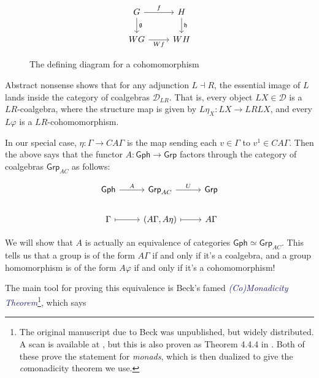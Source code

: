 \documentclass[microtype]{gtpart}
\theoremstyle{definition}
\theoremstyle{theorem}
\newcommand*{\catFont}[1]{\mathsf{#1}}
\newcommand{\Grp}{\catFont{Grp}}
\newcommand*{\important}[1]{\textcolor{MidnightBlue}{\emph{#1}}}
\begin{document}
\begin{figure}
    \[
        \begin{tikzcd}
        G & H \\
        WG & WH
        \arrow["\mathfrak{g}", from=1-1, to=2-1]
        \arrow["\mathfrak{h}", from=1-2, to=2-2]
        \arrow["f", from=1-1, to=1-2]
        \arrow["Wf"', from=2-1, to=2-2]
        \end{tikzcd}
    \]    
    \caption{The defining diagram for a cohomomorphism}
    \label{fig:cohom}
\end{figure}
\setlength\mathsurround{0.8pt}

Abstract nonsense shows that for any adjunction $L \dashv R$, the 
essential image of $L$ lands inside the category of coalgebras $\mathcal{D}_{LR}$.
That is, every object $LX \in \mathcal{D}$ is a $LR$-coalgebra, 
where the structure map is given by $L \eta_X : LX \to LRLX$, and every 
$L \varphi$ is a $LR$-cohomomorphism.

In our special case, $\eta : \Gamma \to CA\Gamma$ is the map sending 
each $v \in \Gamma$ to $v^1 \in CA\Gamma$. Then the above says that the 
functor $A : \mathsf{Gph} \to \mathsf{Grp}$ factors through the 
category of coalgebras $\mathsf{Grp}_{AC}$ as follows:

\setlength\mathsurround{0pt}
\[\begin{tikzcd}
	{\mathsf{Gph}} & {\mathsf{Grp}_{AC}} & {\mathsf{Grp}} \\
	\Gamma & {(A\Gamma, A \eta)} & A\Gamma
	\arrow[maps to, from=2-1, to=2-2]
	\arrow[maps to, from=2-2, to=2-3]
	\arrow["A", from=1-1, to=1-2]
	\arrow["U", from=1-2, to=1-3]
\end{tikzcd}\]
\setlength\mathsurround{0.8pt}

We will show that $A$ is actually an equivalence of categories 
$\mathsf{Gph} \simeq \Grp_{AC}$. This tells us that a group is of the 
form $A\Gamma$ if and only if it's a coalgebra, and a group homomorphism is 
of the form $A\varphi$ if and only if it's a cohomomorphism!

The main tool for proving this equivalence is Beck's famed
\important{(Co)Monadicity Theorem}\footnote{The original manuscript due to Beck 
was unpublished, but widely distributed. A scan is available at
\cite{beckBeckMonadicityTheorem1968}, but this is also proven as
Theorem 4.4.4 in \cite{borceuxCategoriesStructures1994}. Both of 
these prove the statement for \emph{monads}, which is then dualized to give
the \emph{co}monadicity theorem we use.}, which says
\end{document}
